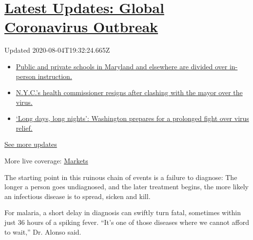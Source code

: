 \hypertarget{latest-updates-global-coronavirus-outbreak}{%
\section{\texorpdfstring{\href{https://www.nytimes.com/2020/08/04/world/coronavirus-cases.html?action=click\&pgtype=Article\&state=default\&region=MAIN_CONTENT_1\&context=storylines_live_updates}{Latest
Updates: Global Coronavirus
Outbreak}}{Latest Updates: Global Coronavirus Outbreak}}\label{latest-updates-global-coronavirus-outbreak}}

Updated 2020-08-04T19:32:24.665Z

\begin{itemize}
\tightlist
\item
  \href{https://www.nytimes.com/2020/08/04/world/coronavirus-cases.html?action=click\&pgtype=Article\&state=default\&region=MAIN_CONTENT_1\&context=storylines_live_updates\#link-4825b93}{Public
  and private schools in Maryland and elsewhere are divided over
  in-person instruction.}
\item
  \href{https://www.nytimes.com/2020/08/04/world/coronavirus-cases.html?action=click\&pgtype=Article\&state=default\&region=MAIN_CONTENT_1\&context=storylines_live_updates\#link-4d1eafa8}{N.Y.C.'s
  health commissioner resigns after clashing with the mayor over the
  virus.}
\item
  \href{https://www.nytimes.com/2020/08/04/world/coronavirus-cases.html?action=click\&pgtype=Article\&state=default\&region=MAIN_CONTENT_1\&context=storylines_live_updates\#link-6b644638}{`Long
  days, long nights': Washington prepares for a prolonged fight over
  virus relief.}
\end{itemize}

\href{https://www.nytimes.com/2020/08/04/world/coronavirus-cases.html?action=click\&pgtype=Article\&state=default\&region=MAIN_CONTENT_1\&context=storylines_live_updates}{See
more updates}

More live coverage:
\href{https://www.nytimes.com/live/2020/08/04/business/stock-market-today-coronavirus?action=click\&pgtype=Article\&state=default\&region=MAIN_CONTENT_1\&context=storylines_live_updates}{Markets}

The starting point in this ruinous chain of events is a failure to
diagnose: The longer a person goes undiagnosed, and the later treatment
begins, the more likely an infectious disease is to spread, sicken and
kill.

For malaria, a short delay in diagnosis can swiftly turn fatal,
sometimes within just 36 hours of a spiking fever. ``It's one of those
diseases where we cannot afford to wait,'' Dr. Alonso said.

